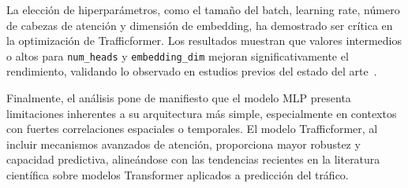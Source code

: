 La elección de hiperparámetros, como el tamaño del batch, learning rate, número de cabezas de atención y dimensión de embedding, ha demostrado ser crítica en la optimización de Trafficformer. Los resultados muestran que valores intermedios o altos para \texttt{num\_heads} y \texttt{embedding\_dim} mejoran significativamente el rendimiento, validando lo observado en estudios previos del estado del arte~\cite{trafficformer}.

Finalmente, el análisis pone de manifiesto que el modelo MLP presenta limitaciones inherentes a su arquitectura más simple, especialmente en contextos con fuertes correlaciones espaciales o temporales. El modelo Trafficformer, al incluir mecanismos avanzados de atención, proporciona mayor robustez y capacidad predictiva, alineándose con las tendencias recientes en la literatura científica sobre modelos Transformer aplicados a predicción del tráfico.
